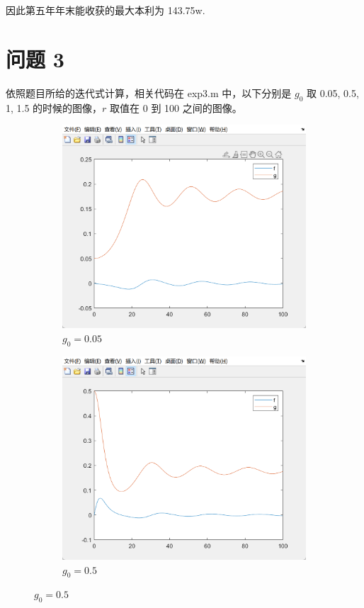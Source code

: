 \documentclass[11pt]{ctexart}
\begin{document}
	因此第五年年末能收获的最大本利为 143.75w.

	\clearpage

	\section{问题 3}
	依照题目所给的迭代式计算，相关代码在 exp3.m 中，以下分别是 \(g_0\) 取 0.05, 0.5, 1, 1.5 的时候的图像，\(r\) 取值在 0 到 100 之间的图像。
	\begin{figure}[H]
		\centering
		\begin{subfigure}[h]{0.4\textwidth}
			\includegraphics[width=\textwidth]{picture/exp3_1_1}
			\caption{\(g_0=0.05\)}
		\end{subfigure}
		\begin{subfigure}[h]{0.4\textwidth}
			\includegraphics[width=\textwidth]{picture/exp3_1_2}
			\caption{\(g_0=0.5\)}
		\end{subfigure}


\end{figure}
\end{document}
